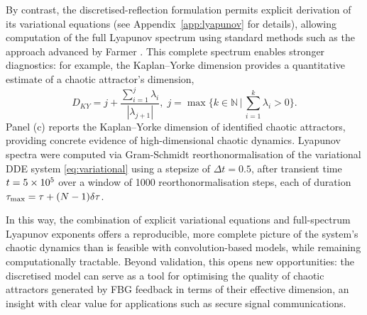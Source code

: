 %
By contrast, the discretised-reflection formulation permits explicit derivation of its variational equations (see Appendix~\ref{app:lyapunov} for details), allowing computation of the full Lyapunov spectrum using standard methods such as the approach advanced by Farmer \cite{farmer1982chaotic}. 
This complete spectrum enables stronger diagnostics: for example, the Kaplan–Yorke dimension \cite{frederickson1983liapunov} provides a quantitative estimate of a chaotic attractor's dimension, 
%
\begin{equation}
    \label{eq:kaplan_yorke}
    D_{KY} = j + \frac{\sum_{i=1}^{j} \lambda_i}{|\lambda_{j+1}|}, \; j = \max\{k \in \mathbb{N} \,|\, \sum_{i=1}^{k} \lambda_i > 0\}.
\end{equation}
%
Panel (c) reports the Kaplan–Yorke dimension of identified chaotic attractors, providing concrete evidence of high-dimensional chaotic dynamics.
Lyapunov spectra were computed via Gram-Schmidt reorthonormalisation of the variational DDE system \eqref{eq:variational} using a stepsize of $\Delta t = 0.5$, after transient time $t = 5\times 10^{5}$ over a window of 1000 reorthonormalisation steps, each of duration $\tau_\text{max}=\tau+(N-1)\delta \tau$.
%
\par
%
In this way, the combination of explicit variational equations and full-spectrum Lyapunov exponents offers a reproducible, more complete picture of the system's chaotic dynamics than is feasible with convolution-based models, while remaining computationally tractable. 
Beyond validation, this opens new opportunities: the discretised model can serve as a tool for optimising the quality of chaotic attractors generated by FBG feedback in terms of their effective dimension, an insight with clear value for applications such as secure signal communications.
%
%
